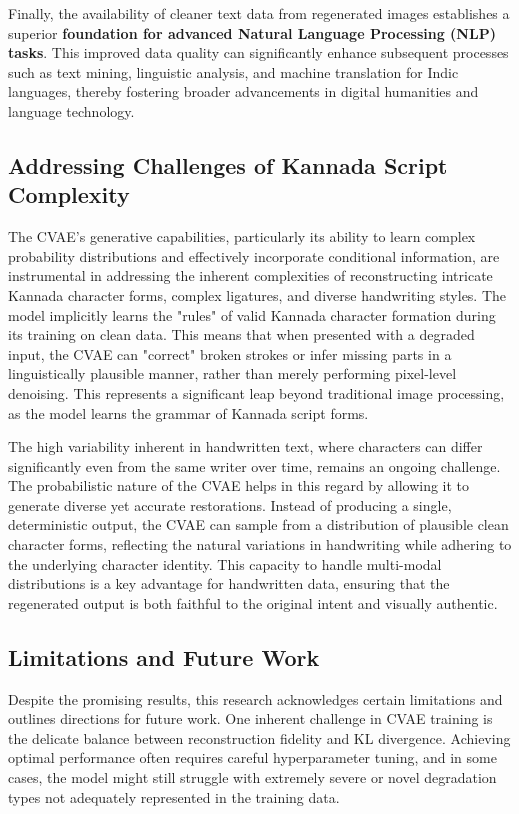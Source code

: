 \documentclass[conference]{IEEEtran}
\begin{document}
Finally, the availability of cleaner text data from regenerated images establishes a superior \textbf{foundation for advanced Natural Language Processing (NLP) tasks}. This improved data quality can significantly enhance subsequent processes such as text mining, linguistic analysis, and machine translation for Indic languages, thereby fostering broader advancements in digital humanities and language technology.\cite{Dai2024}

\subsection{Addressing Challenges of Kannada Script Complexity}
\justify
The CVAE's generative capabilities, particularly its ability to learn complex probability distributions and effectively incorporate conditional information, are instrumental in addressing the inherent complexities of reconstructing intricate Kannada character forms, complex ligatures, and diverse handwriting styles. The model implicitly learns the "rules" of valid Kannada character formation during its training on clean data. This means that when presented with a degraded input, the CVAE can "correct" broken strokes or infer missing parts in a linguistically plausible manner, rather than merely performing pixel-level denoising. This represents a significant leap beyond traditional image processing, as the model learns the grammar of Kannada script forms.

The high variability inherent in handwritten text, where characters can differ significantly even from the same writer over time, remains an ongoing challenge.\cite{Bhunia2023, Hebbi2023} The probabilistic nature of the CVAE helps in this regard by allowing it to generate diverse yet accurate restorations. Instead of producing a single, deterministic output, the CVAE can sample from a distribution of plausible clean character forms, reflecting the natural variations in handwriting while adhering to the underlying character identity. This capacity to handle multi-modal distributions is a key advantage for handwritten data, ensuring that the regenerated output is both faithful to the original intent and visually authentic.

\subsection{Limitations and Future Work}
\justify
Despite the promising results, this research acknowledges certain limitations and outlines directions for future work. One inherent challenge in CVAE training is the delicate balance between reconstruction fidelity and KL divergence. Achieving optimal performance often requires careful hyperparameter tuning, and in some cases, the model might still struggle with extremely severe or novel degradation types not adequately represented in the training data.
\end{document}
